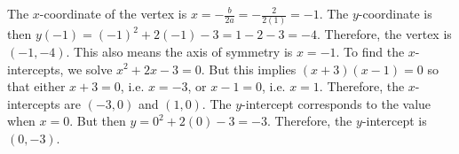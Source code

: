 \documentclass[11pt,letterpaper]{article}
\begin{document}
The $x$-coordinate of the vertex is $x= -\frac{b}{2a}= -\frac{2}{2(1)}= -1$. The $y$-coordinate is then $y(-1)= (-1)^2 + 2(-1) - 3= 1 - 2 - 3= -4$. Therefore, the vertex is $(-1, -4)$. This also means the axis of symmetry is $x= -1$. To find the $x$-intercepts, we solve $x^2 + 2x - 3= 0$. But this implies $(x + 3)(x - 1)= 0$ so that either $x + 3= 0$, i.e. $x= -3$, or $x - 1= 0$, i.e. $x= 1$. Therefore, the $x$-intercepts are $(-3, 0)$ and $(1, 0)$. The $y$-intercept corresponds to the value when $x= 0$. But then $y= 0^2 + 2(0) - 3= -3$. Therefore, the $y$-intercept is $(0, -3)$. 


\end{document}
